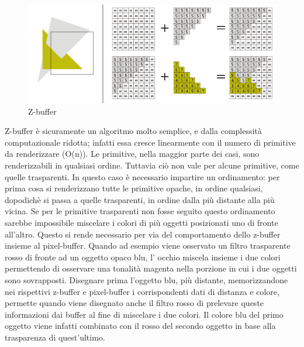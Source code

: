 \begin{figure}[htb]
 \centering
 \includegraphics[width=1.0\linewidth]{images/chapter_stato_arte/stato_arte_z_buffer.png}\hfill
 \caption[Z-buffer]{Z-buffer}
 \label{fig:stato_arte_z_buffer}
\end{figure}

Z-buffer è sicuramente un algoritmo molto semplice, e dalla complessità computazionale ridotta; infatti essa cresce linearmente con il numero di primitive da renderizzare (O(n)). Le primitive, nella maggior parte dei casi, sono renderizzabili in qualsiasi ordine. 
Tuttavia ciò non vale per alcune primitive, come quelle trasparenti. In questo caso è necessario impartire un ordinamento: per prima cosa si renderizzano tutte le primitive opache, in ordine qualsiasi, dopodichè si passa a quelle trasparenti, in ordine dalla più distante alla più vicina. 
Se per le primitive trasparenti non fosse seguito questo ordinamento sarebbe impossibile miscelare i colori di più oggetti posizionati uno di fronte all’altro. Questo si rende necessario per via del comportamento dello z-buffer insieme al pixel-buffer.
Quando ad esempio viene osservato un filtro trasparente rosso di fronte ad un oggetto opaco blu, l’ occhio miscela insieme i due colori permettendo di osservare una tonalità magenta nella porzione in cui i due oggetti sono sovrapposti.
Disegnare prima l’oggetto blu, più distante, memorizzandone nei rispettivi z-buffer e pixel-buffer i corrispondenti dati di distanza e colore, permette quando viene disegnato anche il filtro rosso di prelevare queste informazioni dai buffer al fine di miscelare i due colori.
Il colore blu del primo oggetto viene infatti combinato con il rosso del secondo oggetto in base alla trasparenza di quest’ultimo.
\\
